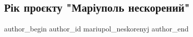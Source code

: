  
 
 
 
 

\subsection{Рік проєкту "Маріуполь нескорений"}
\label{sec:02_08_2023.fb.mariupol_neskorenyj.1.rik_proektu_mariupol_neskorenyj}

\ifcmt
 author_begin
   author_id mariupol_neskorenyj
 author_end
\fi
